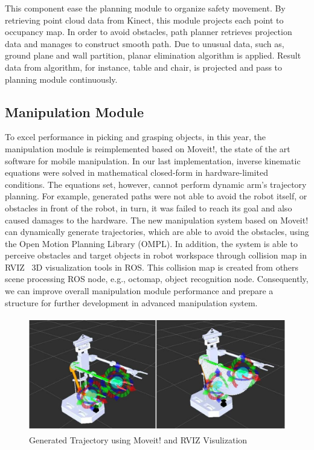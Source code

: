 \documentclass{llncs}
\begin{document}
This component ease the planning module to organize safety movement. By retrieving point cloud data from Kinect, this module projects each point to occupancy map. In order to avoid obstacles, path planner retrieves projection data and manages to construct smooth path. Due to unusual data, such as, ground plane and wall partition, planar elimination algorithm is applied. Result data from algorithm, for instance, table and chair, is projected and pass to planning module continuously\cite{avoid}.

\subsection{Manipulation Module}

To excel performance in picking and grasping objects, in this year, the manipulation module is reimplemented based on Moveit!, the state of the art software for mobile manipulation. In our last implementation, inverse kinematic equations were solved in mathematical closed-form in hardware-limited conditions.  The equations set, however, cannot perform dynamic arm’s trajectory planning. For example, generated paths were not able to avoid the robot itself, or obstacles in front of the robot, in turn, it was failed to reach its goal and also caused damages to the hardware. The new manipulation system based on Moveit! can dynamically generate trajectories, which are able to avoid the obstacles, using the Open Motion Planning Library (OMPL). In addition, the system is able to perceive obstacles and target objects in robot workspace through collision map in RVIZ \textemdash\ 3D visualization tools in ROS. This collision map is created from others scene processing ROS node, e.g., octomap, object recognition node. Consequently, we can improve overall manipulation module performance and prepare a structure for further development in advanced manipulation system.
\begin{figure}
\centering
\includegraphics[width=12cm, height=5cm]{Moveit}
\caption{Generated Trajectory using Moveit! and RVIZ Visulization}
\label{fig:moveit}
\end{figure} 
\end{document}
